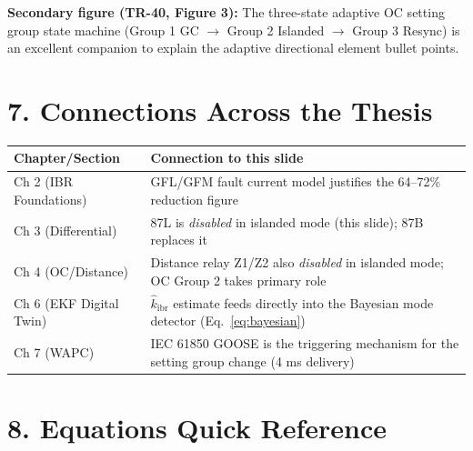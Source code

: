\documentclass[12pt,a4paper]{article}
\begin{document}
\textbf{Secondary figure (TR-40, Figure 3):} The three-state adaptive OC setting
group state machine (Group 1 GC $\to$ Group 2 Islanded $\to$ Group 3 Resync)
is an excellent companion to explain the adaptive directional element bullet points.

\section{7.\; Connections Across the Thesis}

\begin{tabular}{@{}lp{10cm}@{}}
\toprule
\textbf{Chapter/Section} & \textbf{Connection to this slide}\\
\midrule
Ch 2 (IBR Foundations) & GFL/GFM fault current model justifies the
  64--72\% reduction figure\\
Ch 3 (Differential) & 87L is \emph{disabled} in islanded mode (this slide);
  87B replaces it\\
Ch 4 (OC/Distance) & Distance relay Z1/Z2 also \emph{disabled} in
  islanded mode; OC Group 2 takes primary role\\
Ch 6 (EKF Digital Twin) & $\hat{k}_\mathrm{ibr}$ estimate feeds directly into the
  Bayesian mode detector (Eq.~\ref{eq:bayesian})\\
Ch 7 (WAPC) & IEC 61850 GOOSE is the triggering mechanism for the
  setting group change (4 ms delivery)\\
\bottomrule
\end{tabular}

\section{8.\; Equations Quick Reference}
\end{document}
